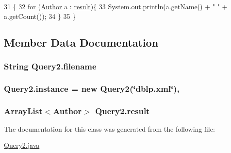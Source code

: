 \begin{DoxyCode}
31                            \{
32         \textcolor{keywordflow}{for} (\hyperlink{classAuthor}{Author} a : \hyperlink{classQuery2_a0e6787ef46755e839db06e99a090e311}{result})\{
33             System.out.println(a.getName() + \textcolor{stringliteral}{" "} + a.getCount());
34         \}
35     \}
\end{DoxyCode}


\subsection{Member Data Documentation}
\subsubsection[{\texorpdfstring{filename}{filename}}]{\setlength{\rightskip}{0pt plus 5cm}String Query2.\+filename\hspace{0.3cm}{\ttfamily [private]}}\hypertarget{classQuery2_a2e312018f6ecd6d6b58e5ada0338ef6c}{}\label{classQuery2_a2e312018f6ecd6d6b58e5ada0338ef6c}
\subsubsection[{\texorpdfstring{instance}{instance}}]{ Query2.\+instance = new {\bf Query2}(\char`\"{}dblp.\+xml\char`\"{})\hspace{0.3cm}{\ttfamily [static]}, {\ttfamily [private]}}\hypertarget{classQuery2_ad0d6f793ef89bb9a3a82358a30cd086d}{}\label{classQuery2_ad0d6f793ef89bb9a3a82358a30cd086d}
\subsubsection[{\texorpdfstring{result}{result}}]{\setlength{\rightskip}{0pt plus 5cm}Array\+List$<${\bf Author}$>$ Query2.\+result\hspace{0.3cm}{\ttfamily [private]}}\hypertarget{classQuery2_a0e6787ef46755e839db06e99a090e311}{}\label{classQuery2_a0e6787ef46755e839db06e99a090e311}


The documentation for this class was generated from the following file\+:\begin{DoxyCompactItemize}
\item 
\hyperlink{Query2_8java}{Query2.\+java}\end{DoxyCompactItemize}

